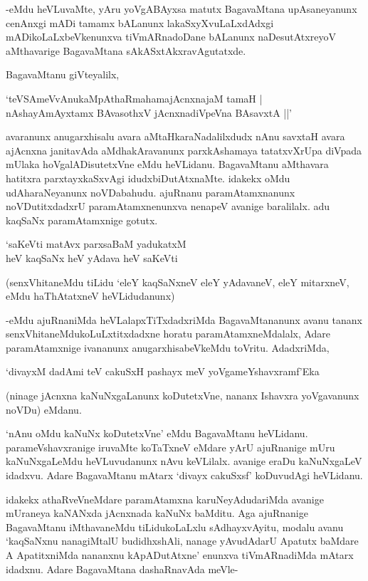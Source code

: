 -eMdu heVLuvaMte, yAru yoVgABAyxsa matutx BagavaMtana upAsaneyanunx cenAnxgi mADi tamamx bALanunx lakaSxyXvuLaLxdAdxgi mADikoLaLxbeVkenunxva tiVmARnadoDane bALanunx naDesutAtxreyoV aMthavarige BagavaMtana sAkASxtAkxravAgutatxde.

BagavaMtanu giVteyalilx,

\begin{shloka}
`teVSAmeVvAnukaMpAthaRmahamajAcnxnajaM tamaH |\\
nAshayAmAyxtamx BAvasothxV jAcnxnadiVpeVna BAsavxtA ||'
\end{shloka}

avaranunx anugarxhisalu avara aMtaHkaraNadalilxdudx nAnu savxtaH avara ajAcnxna janitavAda aMdhakAravanunx parxkAshamaya tatatxvXrUpa diVpada mUlaka hoVgalADisutetxVne eMdu heVLidanu. BagavaMtanu aMthavara hatitxra parxtayxkaSxvAgi idudxbiDutAtxnaMte. idakekx oMdu udAharaNeyanunx noVDabahudu. ajuRnanu paramAtamxnanunx noVDutitxdadxrU paramAtamxnenunxva nenapeV avanige baralilalx. adu kaqSaNx paramAtamxnige gotutx.

\begin{shloka}
`saKeVti matAvx parxsaBaM yadukatxM\\
heV kaqSaNx heV yAdava heV saKeVti
\end{shloka}

(senxVhitaneMdu tiLidu `eleY kaqSaNxneV eleY yAdavaneV, eleY mitarxneV, eMdu haThAtatxneV heVLidudanunx)

-eMdu ajuRnaniMda heVLalapxTiTxdadxriMda BagavaMtananunx avanu tananx senxVhitaneMdukoLuLxtitxdadxne horatu paramAtamxneMdalalx, Adare paramAtamxnige ivananunx anugarxhisabeVkeMdu toVritu. AdadxriMda,

\begin{shloka}
`divayxM dadAmi teV cakuSxH pashayx meV yoVgameYshavxramf'Eka
\end{shloka}

(ninage jAcnxna kaNuNxgaLanunx koDutetxVne, nananx Ishavxra yoVgavanunx noVDu) eMdanu.

`nAnu oMdu kaNuNx koDutetxVne' eMdu BagavaMtanu heVLidanu. parameVshavxranige iruvaMte koTaTxneV eMdare yArU ajuRnanige mUru kaNuNxgaLeMdu heVLuvudanunx nAvu keVLilalx. avanige eraDu kaNuNxgaLeV idadxvu. Adare BagavaMtanu mAtarx `divayx cakuSxsf' koDuvudAgi heVLidanu.

idakekx athaRveVneMdare paramAtamxna karuNeyAdudariMda avanige mUraneya kaNANxda jAcnxnada kaNuNx baMditu. Aga ajuRnanige BagavaMtanu iMthavaneMdu tiLidukoLaLxlu sAdhayxvAyitu, modalu avanu `kaqSaNxnu nanagiMtalU budidhxshAli, nanage yAvudAdarU Apatutx baMdare A ApatitxniMda nananxnu kApADutAtxne' enunxva tiVmARnadiMda mAtarx idadxnu. Adare BagavaMtana dashaRnavAda meVle-

